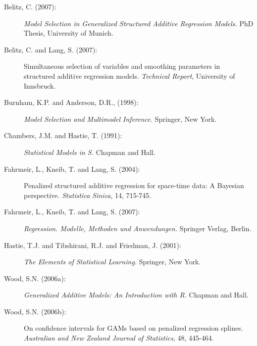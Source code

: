 \begin{description}
\item[Belitz, C. (2007):] {\it Model Selection in Generalized Structured Additive Regression Models.} PhD Thesis, University of Munich.

\item [Belitz, C. and Lang, S. (2007):] Simultaneous selection of variables and smoothing
parameters in structured additive regression models. {\it Technical Report}, University of Innsbruck.

\item[Burnham, K.P. and Anderson, D.R., (1998):] {\it Model Selection and Multimodel Inference.} Springer, New York.

\item[Chambers, J.M. and Hastie, T. (1991):] {\it Statistical Models in S.} Chapman and Hall.

\item[Fahrmeir, L., Kneib, T. and Lang, S. (2004):] Penalized
structured additive regression for space-time data: A Bayesian
perspective. {\it Statistica Sinica}, 14, 715-745.

\item[Fahrmeir, L., Kneib, T. and Lang, S. (2007):] {\it Regression. Modelle, Methoden und Anwendungen.} Springer Verlag, Berlin.

\item[Hastie, T.J. and Tibshirani, R.J. and Friedman, J. (2001):] {\it The Elements of Statistical Learning.} Springer, New York.

\item[Wood, S.N. (2006a):] {\it Generalized Additive Models: An Introduction with R.} Chapman and Hall.

\item[Wood, S.N. (2006b):] On confidence intervals for GAMs based on penalized regression splines.
{\it Australian and New Zealand Journal of Statistics}, 48, 445-464.
\end{description}





